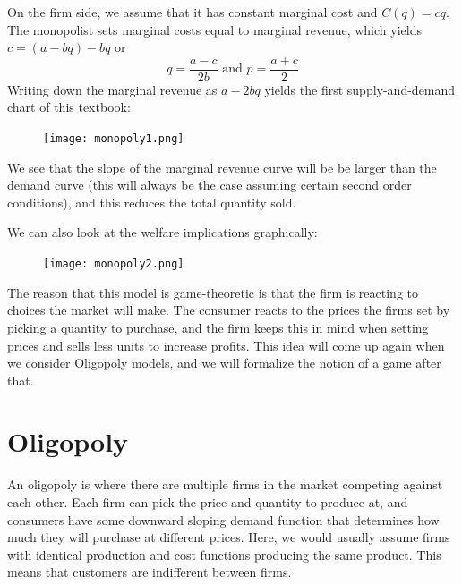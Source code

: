 On the firm side, we assume that it has constant marginal cost and $C(q) = cq$. The monopolist sets marginal costs equal to marginal revenue, which yields $c = (a - bq) - bq$ or
\begin{equation}
    q = \frac{a - c}{2b} \text{ and } p = \frac{a + c}{2}
\end{equation}
Writing down the marginal revenue as $a - 2bq$ yields the first supply-and-demand chart of this textbook:
\begin{figure}[H]
    \centering
    \texttt{[image: monopoly1.png]}
\end{figure}
We see that the slope of the marginal revenue curve will be be larger than the demand curve (this will always be the case assuming certain second order conditions), and this reduces the total quantity sold. 

We can also look at the welfare implications graphically:
\begin{figure}[H]
    \centering
    \texttt{[image: monopoly2.png]}
\end{figure}

The reason that this model is game-theoretic is that the firm is reacting to choices the market will make. The consumer reacts to the prices the firms set by picking a quantity to purchase, and the firm keeps this in mind when setting prices and sells less units to increase profits. This idea will come up again when we consider Oligopoly models, and we will formalize the notion of a game after that.

\section{Oligopoly}
An oligopoly is where there are multiple firms in the market competing against each other. Each firm can pick the price and quantity to produce at, and consumers have some downward sloping demand function that determines how much they will purchase at different prices. Here, we would usually assume firms with identical production and cost functions producing the same product. This means that customers are indifferent between firms.


